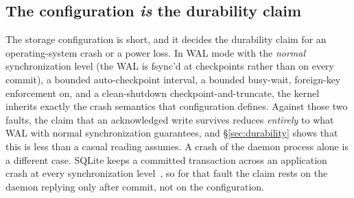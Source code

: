 \documentclass[11pt,a4paper]{article}
\theoremstyle{definition}
\theoremstyle{remark}
\begin{document}
\subsection{The configuration \emph{is} the durability claim}
\ifpdmargincolumn\pdcheckpointwindow\fi
The storage configuration is short, and it decides the durability claim for an
operating-system crash or a power loss. In WAL mode with
the \emph{normal} synchronization level (the WAL is fsync'd at checkpoints rather
than on every commit), a bounded auto-checkpoint interval, a bounded busy-wait,
foreign-key enforcement on, and a clean-shutdown checkpoint-and-truncate, the
kernel inherits exactly the crash semantics that configuration defines. Against
those two faults, the claim that an acknowledged write survives reduces
\emph{entirely} to what WAL with normal synchronization guarantees, and
\S\ref{sec:durability} shows that this is less than a casual reading assumes.
A crash of the daemon process alone is a different case. SQLite keeps a
committed transaction across an application crash at every synchronization
level~, so for that fault the claim rests on the daemon
replying only after commit, not on the configuration.
\end{document}

